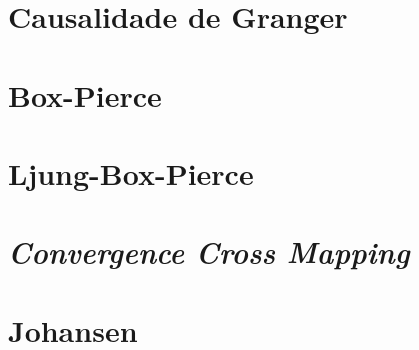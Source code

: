 \section{Causalidade de Granger}

\section{Box-Pierce}

\section{Ljung-Box-Pierce}

\section{\emph{Convergence Cross Mapping}}

\section{Johansen}
